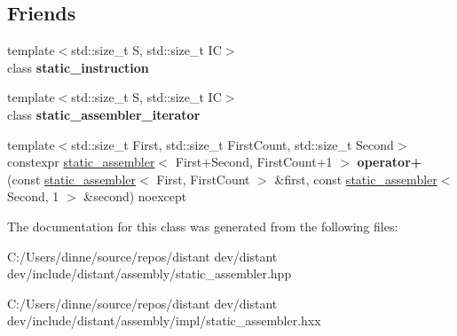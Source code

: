 \subsection*{Friends}
\begin{DoxyCompactItemize}
\item 
\mbox{\label{classdistant_1_1assembly_1_1static__assembler_a9604961da7981a7989f42842bd1273b8}} 
{\footnotesize template$<$std\+::size\+\_\+t S, std\+::size\+\_\+t IC$>$ }\\class {\bfseries static\+\_\+instruction}
\item 
\mbox{\label{classdistant_1_1assembly_1_1static__assembler_a4dac94e37604f6ccf8734bdc7c336ea9}} 
{\footnotesize template$<$std\+::size\+\_\+t S, std\+::size\+\_\+t IC$>$ }\\class {\bfseries static\+\_\+assembler\+\_\+iterator}
\item 
\mbox{\label{classdistant_1_1assembly_1_1static__assembler_a340e6bcde814c6003c7bba5a0a9da5c3}} 
{\footnotesize template$<$std\+::size\+\_\+t First, std\+::size\+\_\+t First\+Count, std\+::size\+\_\+t Second$>$ }\\constexpr \mbox{\hyperlink{classdistant_1_1assembly_1_1static__assembler}{static\+\_\+assembler}}$<$ First+Second, First\+Count+1 $>$ {\bfseries operator+} (const \mbox{\hyperlink{classdistant_1_1assembly_1_1static__assembler}{static\+\_\+assembler}}$<$ First, First\+Count $>$ \&first, const \mbox{\hyperlink{classdistant_1_1assembly_1_1static__assembler}{static\+\_\+assembler}}$<$ Second, 1 $>$ \&second) noexcept
\end{DoxyCompactItemize}


The documentation for this class was generated from the following files\+:\begin{DoxyCompactItemize}
\item 
C\+:/\+Users/dinne/source/repos/distant dev/distant dev/include/distant/assembly/static\+\_\+assembler.\+hpp\item 
C\+:/\+Users/dinne/source/repos/distant dev/distant dev/include/distant/assembly/impl/static\+\_\+assembler.\+hxx\end{DoxyCompactItemize}
